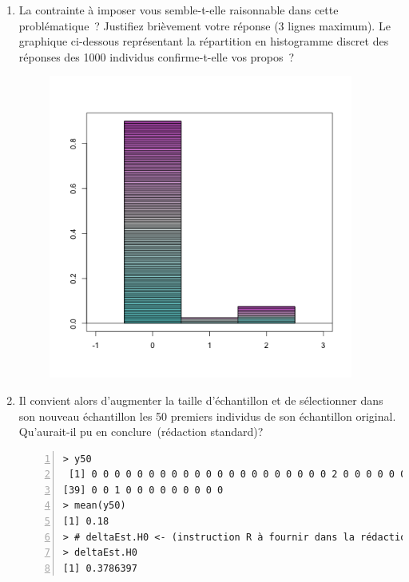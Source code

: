 \documentclass[10pt]{report}
\begin{document}
\begin{exercice}
\begin{enumerate}
\item La contrainte à imposer vous semble-t-elle raisonnable dans cette problématique~?  Justifiez brièvement votre réponse (3 lignes maximum). Le graphique ci-dessous représentant la répartition en histogramme discret des réponses des 1000 individus confirme-t-elle vos propos~?





\begin{center}
\includegraphics[width=12cm,height=10cm]{img/repProdB}
\end{center}


\item Il convient alors d'augmenter la taille d'échantillon et de sélectionner dans son nouveau échantillon les 50 premiers individus de son échantillon original. Qu'aurait-il pu en conclure~(rédaction standard)?

 
\IndicR
\begin{Verbatim}[frame=leftline,fontfamily=tt,fontshape=n,numbers=left]
> y50
 [1] 0 0 0 0 0 0 0 0 0 0 0 0 0 0 0 0 0 0 0 0 0 2 0 0 0 0 0 0 2 2 2 0 0 0 0 0 0 0
[39] 0 0 1 0 0 0 0 0 0 0 0 0
> mean(y50)
[1] 0.18
> # deltaEst.H0 <- (instruction R à fournir dans la rédaction)
> deltaEst.H0
[1] 0.3786397
\end{Verbatim}

 

\begin{Correction}


\end{Correction}
\end{enumerate}
\end{exercice}
\end{document}
